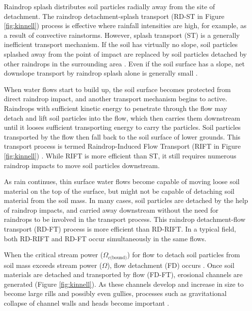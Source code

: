 Raindrop splash distributes soil particles radially away from the site of
detachment. The raindrop detachment-splash transport (RD-ST in Figure
\ref{fig:kinnell}) process is effective where rainfall intensities are high, for
example, as a result of convective rainstorms. However, splash transport (ST) is
a generally inefficient transport mechanism. If the soil has virtually no slope,
soil particles splashed away from the point of impact are replaced by soil
particles detached by other raindrops in the surrounding area
\citep{kinnell2000-discourse,zartl2001-25}. Even if the soil surface has a
slope, net downslope transport by raindrop splash alone is generally small
\citep{kinnell2001-749}.

When water flows start to build up, the soil surface becomes protected from
direct raindrop impact, and another transport mechanism begins to active.
Raindrops with sufficient kinetic energy to penetrate through the flow may
detach and lift soil particles into the flow, which then carries them downstream
until it looses sufficient transporting energy to carry the particles. Soil
particles transported by the flow then fall back to the soil surface of lower
grounds. This transport process is termed Raindrop-Induced Flow Transport (RIFT
in Figure \ref{fig:kinnell}) \citep{kinnell1990-497}. While RIFT is more
efficient than ST, it still requires numerous raindrop impacts to move soil
particles downstream.

As rain continues, thin surface water flows become capable of moving loose soil
material on the top of the surface, but might not be capable of detaching soil
material from the soil mass. In many cases, soil particles are detached by the
help of raindrop impacts, and carried away downstream without the need for
raindrops to be involved in the transport process. This raindrop detachment-flow
transport (RD-FT) process is more efficient than RD-RIFT. In a typical field,
both RD-RIFT and RD-FT occur simultaneously in the same flows.

When the critical stream power ($\Omega_{c\textrm{(bound)}}$) for flow to detach
soil particles from soil mass exceeds stream power ($\Omega$), flow detachment
(FD) occurs \citep{kinnell2000-discourse}. Once soil materials are detached and
transported by flow (FD-FT), erosional channels are generated (Figure
\ref{fig:kinnell}). As these channels develop and increase in size to become
large rills and possibly even gullies, processes such as gravitational collapse
of channel walls and heads become important \citep{boardman2003-165}.


